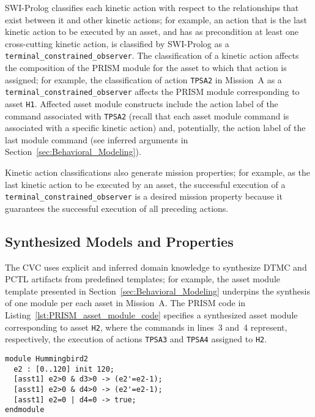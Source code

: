 SWI-Prolog classifies each kinetic action with respect to the relationships that exist between it and other kinetic actions; for example, an action that is the last kinetic action to be executed by an asset, and has as precondition at least one cross-cutting kinetic action, is classified by SWI-Prolog as a \texttt{terminal\_constrained\_observer}. The classification of a kinetic action affects the composition of the PRISM module for the asset to which that action is assigned; for example, the classification of action \texttt{TPSA2} in Mission~A as a \texttt{terminal\_constrained\_observer} affects the PRISM module corresponding to asset \texttt{H1}. Affected asset module constructs include the action label of the command associated with \texttt{TPSA2} (recall that each asset module command is associated with a specific kinetic action) and, potentially, the action label of the last module command (see inferred arguments in Section~\ref{sec:Behavioral_Modeling}).

Kinetic action classifications also generate mission properties; for example, as the last kinetic action to be executed by an asset, the successful execution of a \texttt{terminal\_con\-strained\_observer} is a desired mission property because it guarantees the successful execution of all preceding actions.

\subsection{Synthesized Models and Properties}
\label{sec:Synthesized_Models_and_Properties}

\noindent The CVC uses explicit and inferred domain knowledge to synthesize DTMC and PCTL artifacts from predefined templates; for example, the asset module template presented in Section~\ref{sec:Behavioral_Modeling} underpins the synthesis of one module per each asset in Mission~A\@. The PRISM code in Listing~\ref{lst:PRISM_asset_module_code} specifies a synthesized asset module corresponding to asset \texttt{H2}, where the commands in lines~3 and~4 represent, respectively, the execution of actions \texttt{TPSA3} and \texttt{TPSA4} assigned to \texttt{H2}.

\begin{lstlisting}[caption={PRISM asset module code},label=lst:PRISM_asset_module_code]
module Hummingbird2
  e2 : [0..120] init 120;
  [asst1] e2>0 & d3>0 -> (e2'=e2-1);
  [asst1] e2>0 & d4>0 -> (e2'=e2-1);
  [asst1] e2=0 | d4=0 -> true;
endmodule
\end{lstlisting}

